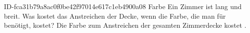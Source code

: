 \begin{exercise}
      {ID-fca31b79a8ac0f0be42f97014e617c1eb4900a08}
      {Farbe}
  \ifproblem\problem
    Ein Zimmer ist  lang und  breit. Was kostet das Anstreichen
    der Decke, wenn die Farbe, die man für  benötigt,  kostet?
  \fi
  \ifoutcome\outcome
    Die Farbe zum Anstreichen der gesamten Zimmerdecke kostet .
  \fi
\end{exercise}
